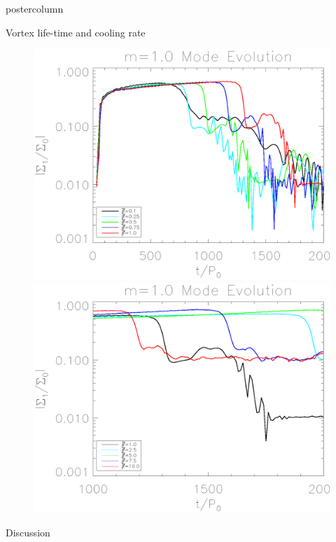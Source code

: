 \documentclass[final,hyperref={pdfpagelabels=false}]{beamer}
\begin{document}
\begin{frame}
\begin{columns}
\begin{column}{.49\textwidth}
\begin{beamercolorbox}[center,wd=\textwidth]{postercolumn}
\begin{minipage}[T]{.95\textwidth}
{\begin{block}{\Large{Vortex life-time and cooling rate}}
                  \begin{figure}
                    \centering
                    \includegraphics[width=\textwidth]{lifetime_regime1}\\
                    \includegraphics[width=\textwidth]{lifetime_regime2}
                  \end{figure}
                  \end{block}

            \vfill
    
            \begin{block}{{\Large Discussion}}\justifying
              {\large{\bf
                  
}}
\end{block}}
\end{minipage}
\end{beamercolorbox}
\end{column}
\end{columns}
\end{frame}
\end{document}
